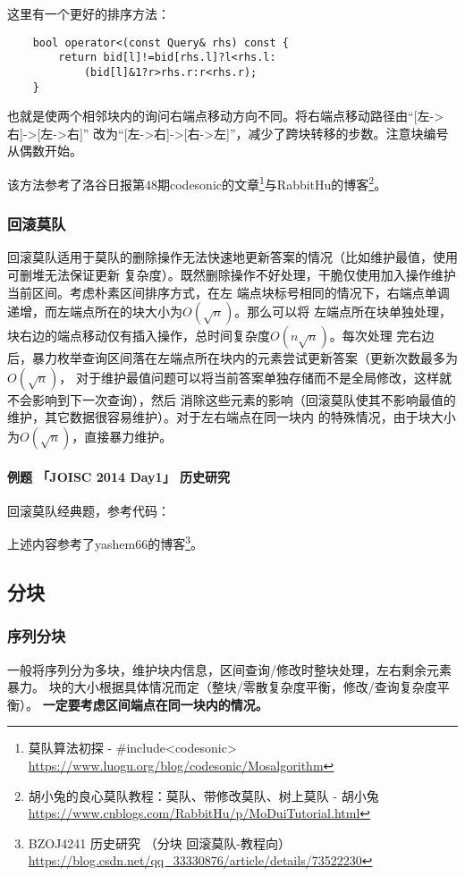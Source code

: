 这里有一个更好的排序方法：
\begin{lstlisting}
    bool operator<(const Query& rhs) const {
        return bid[l]!=bid[rhs.l]?l<rhs.l:
            (bid[l]&1?r>rhs.r:r<rhs.r);
    }
\end{lstlisting}

也就是使两个相邻块内的询问右端点移动方向不同。将右端点移动路径由``[左->右]->[左->右]''
改为``[左->右]->[右->左]''，减少了跨块转移的步数。注意块编号从偶数开始。

该方法参考了洛谷日报第48期codesonic的文章\footnote{
	莫队算法初探 - \#include<codesonic>\\
	\url{https://www.luogu.org/blog/codesonic/Mosalgorithm}
}与RabbitHu的博客\footnote{
	胡小兔的良心莫队教程：莫队、带修改莫队、树上莫队 - 胡小兔
	\url{https://www.cnblogs.com/RabbitHu/p/MoDuiTutorial.html}
}。
\subsubsection{回滚莫队}
回滚莫队适用于莫队的删除操作无法快速地更新答案的情况（比如维护最值，使用可删堆无法保证更新
复杂度）。既然删除操作不好处理，干脆仅使用加入操作维护当前区间。考虑朴素区间排序方式，在左
端点块标号相同的情况下，右端点单调递增，而左端点所在的块大小为$O(\sqrt{n})$。那么可以将
左端点所在块单独处理，块右边的端点移动仅有插入操作，总时间复杂度$O(n\sqrt{n})$。每次处理
完右边后，暴力枚举查询区间落在左端点所在块内的元素尝试更新答案（更新次数最多为$O(\sqrt{n})$，
对于维护最值问题可以将当前答案单独存储而不是全局修改，这样就不会影响到下一次查询），然后
消除这些元素的影响（回滚莫队使其不影响最值的维护，其它数据很容易维护）。对于左右端点在同一块内
的特殊情况，由于块大小为$O(\sqrt{n})$，直接暴力维护。

\paragraph{例题 「JOISC 2014 Day1」 历史研究}
回滚莫队经典题，参考代码：



上述内容参考了yashem66的博客\footnote{
	BZOJ4241 历史研究 （分块 回滚莫队-教程向）
	\url{https://blog.csdn.net/qq\_33330876/article/details/73522230}
}。
\subsection{分块}\label{dividing}
\subsubsection{序列分块}
一般将序列分为多块，维护块内信息，区间查询/修改时整块处理，左右剩余元素暴力。
块的大小根据具体情况而定（整块/零散复杂度平衡，修改/查询复杂度平衡）。
{\bfseries 一定要考虑区间端点在同一块内的情况。}

